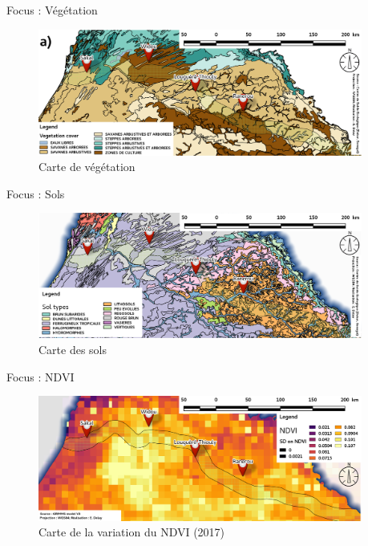 \documentclass[newPxFont]{beamer}
\begin{document}
\begin{frame}[c]{Focus : Végétation}

\begin{figure}
	\centering
	\includegraphics[width = 0.95\textwidth]{img/map_vegetation.png}
  \caption{Carte de végétation}
\end{figure}
\end{frame}

\begin{frame}[c]{Focus : Sols}

\begin{figure}
	\centering
	\includegraphics[width = 0.95\textwidth]{img/map_soil.png}
  \caption{Carte des sols}
\end{figure}
\end{frame}

\begin{frame}[c]{Focus : NDVI}

\begin{figure}
	\centering
	\includegraphics[width = 0.95\textwidth]{img/map_ndvi.png}
  \caption{Carte de la variation du NDVI (2017)}
\end{figure}
\end{frame}
\end{document}
